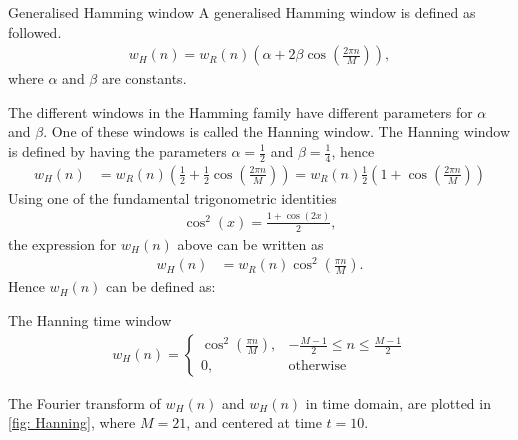 \begin{definition}{Generalised Hamming window}
A generalised Hamming window is defined as followed.
\begin{align*}
    w_H(n)=w_R(n) \left(\alpha +2\beta \cos\left(\frac{2\pi n}{M}\right)\right),
\end{align*}
where $\alpha$ and $\beta$ are constants. 
\end{definition}

The different windows in the Hamming family have different parameters for $\alpha$ and $\beta$. 
One of these windows is called the Hanning window.
The Hanning window is defined by having the parameters $\alpha = \frac{1}{2} $ and $\beta = \frac{1}{4}$, hence
\begin{align*}
    w_H(n)&=w_R(n) \left(\frac{1}{2} + \frac{1}{2} \cos\left(\frac{2\pi n}{M}\right)\right) = w_R(n) \frac{1}{2}\left(1+\cos\left(\frac{2\pi n}{M}\right)\right)
\end{align*}
Using one of the fundamental trigonometric identities
\begin{align*}
    \cos^2(x)=\frac{1+\cos(2x)}{2},
\end{align*}
the expression for $w_H(n)$ above can be written as
\begin{align*}
    w_H(n)&=w_R(n)\cos^2\left(\frac{\pi n}{M}\right).
\end{align*}
Hence $w_H(n)$ can be defined as:
\begin{definition}{The Hanning time window}
   \begin{align*}
        w_H(n)=
    \begin{cases}
    \cos^2\left(\frac{\pi n}{M}\right), & -\frac{M-1}{2}\leq n \leq \frac{M-1}{2} \\
    0, & \text{otherwise}
    \end{cases}   
   \end{align*}
\end{definition}
The Fourier transform of $w_H(n)$ and $w_H(n)$ in time domain, are plotted in \autoref{fig: Hanning}, where $M=21$, and centered at time $t=10$.
